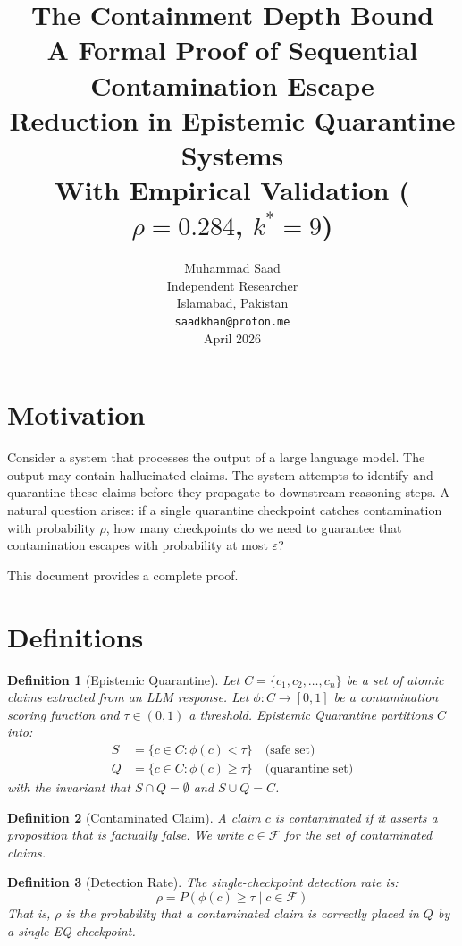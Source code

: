 \documentclass[12pt,a4paper]{article}
\title{
\vspace{-1cm}
\textbf{The Containment Depth Bound} \\[0.3cm]
\large A Formal Proof of Sequential Contamination Escape \\
Reduction in Epistemic Quarantine Systems \\[0.5cm]
\normalsize With Empirical Validation ($\rho = 0.284$, $k^* = 9$)
}
\author{
Muhammad Saad \\
Independent Researcher \\
Islamabad, Pakistan \\
\texttt{saadkhan@proton.me} \\[0.3cm]
\small April 2026
}
\date{}
\newtheorem{definition}{Definition}
\begin{document}
\maketitle
\thispagestyle{fancy}

\section*{Motivation}

Consider a system that processes the output of a large language model. The output may contain hallucinated claims. The system attempts to identify and quarantine these claims before they propagate to downstream reasoning steps. A natural question arises: if a single quarantine checkpoint catches contamination with probability $\rho$, how many checkpoints do we need to guarantee that contamination escapes with probability at most $\varepsilon$?

This document provides a complete proof.

\section{Definitions}

\begin{definition}[Epistemic Quarantine]
Let $C = \{c_1, c_2, \ldots, c_n\}$ be a set of atomic claims extracted from an LLM response. Let $\phi: C \to [0,1]$ be a contamination scoring function and $\tau \in (0,1)$ a threshold. Epistemic Quarantine partitions $C$ into:
\begin{align}
S &= \{c \in C : \phi(c) < \tau\} \quad \text{(safe set)} \\
Q &= \{c \in C : \phi(c) \geq \tau\} \quad \text{(quarantine set)}
\end{align}
with the invariant that $S \cap Q = \emptyset$ and $S \cup Q = C$.
\end{definition}

\begin{definition}[Contaminated Claim]
A claim $c$ is contaminated if it asserts a proposition that is factually false. We write $c \in \mathcal{F}$ for the set of contaminated claims.
\end{definition}

\begin{definition}[Detection Rate]
The single-checkpoint detection rate is:
\[
\rho = P(\phi(c) \geq \tau \mid c \in \mathcal{F})
\]
That is, $\rho$ is the probability that a contaminated claim is correctly placed in $Q$ by a single EQ checkpoint.
\end{definition}
\end{document}
